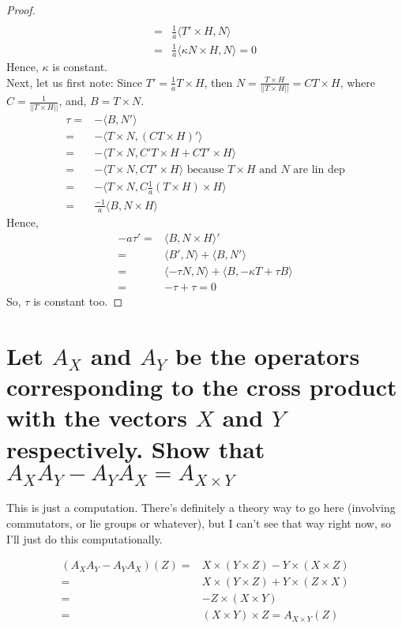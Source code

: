 \documentclass[12pt]{amsart}
\begin{document}
\begin{proof}
\begin{align*}
	\\=&\frac{1}{a}\langle T'\times H,N\rangle
	\\=&\frac{1}{a}\langle\kappa N\times H,N\rangle=0
\end{align*}
Hence, $\kappa$ is constant.
\\Next, let us first note: Since $T'=\frac{1}{a}T\times H$, then $N=\frac{T\times H}{||T\times H||}=CT\times H$, where $C=\frac{1}{||T\times H||}$, and, $B=T\times N$.
\begin{align*}
	\tau=&-\langle B,N'\rangle
	\\=&-\langle T\times N, (CT\times H)'\rangle
	\\=&-\langle T\times N, C'T\times H+CT'\times H\rangle
	\\=&-\langle T\times N, CT'\times H\rangle\text{ because $T\times H$ and $N$ are lin dep}
	\\=&-\langle T\times N, C\frac{1}{a}(T\times H)\times H\rangle
	\\=&\frac{-1}{a}\langle B,N\times H\rangle
\end{align*}
Hence,
\begin{align*}
	-a\tau'=&\langle B,N\times H\rangle'
	\\=&\langle B',N\rangle +\langle B,N'\rangle
	\\=&\langle -\tau N, N\rangle + \langle B,-\kappa T+\tau B\rangle
	\\=&-\tau+\tau=0
\end{align*}
So, $\tau$ is constant too.
\end{proof}

\section{Let $A_X$ and $A_Y$ be the operators corresponding to the cross product with the vectors $X$ and $Y$ respectively. Show that $A_XA_Y-A_YA_X=A_{X\times Y}$}
This is just a computation. There's definitely a theory way to go here (involving commutators, or lie groups or whatever), but I can't see that way right now, so I'll just do this computationally.
\begin{comment}\begin{align*}
	\left(A_xA_y-A_yA_x\right)(z)=&x\times(y\times z)-y\times(x\times z)
	\\=&x\times\left((y_2z_3-y_3z_2)i-(y_1z_3-y_3z_1)j+(y_2z_3-y_3z_2)k \right)
	\\&- y\times\left((x_2z_3-x_3z_2)i-(x_1z_3-x_3z_1)j+(x_2z_3-x_3z_2)k \right)
	\\=&(x_2y_2z_3-x_2y_3z_2+x_3y_1z_3-x_3y_3z_1)i
	\\&-(x_1y_2z_3-x_1y_3z_2-x_3y_2z_3+x_3y_3z_2)j
	\\&+
\end{align*}
\end{comment}
\begin{align*}
	(A_XA_Y-A_YA_X)(Z)=&X\times (Y\times Z)-Y\times(X\times Z)
	\\=&X\times(Y\times Z)+Y\times(Z\times X)
	\\=&-Z\times(X\times Y)
	\\=&(X\times Y)\times Z=A_{X\times Y}(Z)
\end{align*}
\end{document}
